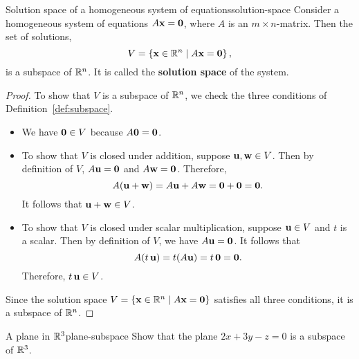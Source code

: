 \begin{proposition}{Solution space of a homogeneous system of equations}{solution-space}
  Consider a homogeneous system of equations $A\mbox{\bf x} = \mbox{\bf 0}$,
  where $A$ is an $m\times n$-matrix. Then the set of solutions,
  \begin{equation*}
    V=\left\{\mbox{\bf x}\in\mathbb{R}^n \mid A\mbox{\bf x} = \mbox{\bf 0}\right\},
  \end{equation*}
  is a subspace of\/ $\mathbb{R}^n$. It is called the \textbf{solution space} of
  the system.%
\end{proposition}

\begin{proof}
  To show that $V$ is a subspace of\/ $\mathbb{R}^{n}$, we check the three
  conditions of Definition~\ref{def:subspace}.
  \begin{itemize}
  \item We have $\mbox{\bf 0}\in V$ because $A\mbox{\bf 0}=\mbox{\bf 0}$.
  \item To show that $V$ is closed under addition, suppose
    $\mbox{\bf u},\mbox{\bf w}\in V$.  Then by definition of $V$,
    $A\mbox{\bf u}=\mbox{\bf 0}$ and $A\mbox{\bf w}=\mbox{\bf 0}$.  Therefore,
    \begin{equation*}
      A(\mbox{\bf u}+\mbox{\bf w}) = A\mbox{\bf u} + A\mbox{\bf w} = \mbox{\bf 0}+\mbox{\bf 0}
      = \mbox{\bf 0}.
    \end{equation*}
    It follows that $\mbox{\bf u}+\mbox{\bf w}\in V$.
  \item To show that $V$ is closed under scalar multiplication,
    suppose $\mbox{\bf u}\in V$ and $t$ is a scalar. Then by definition of
    $V$, we have $A\mbox{\bf u}=\mbox{\bf 0}$. It follows that
    \begin{equation*}
      A(t\,\mbox{\bf u}) = t(A\mbox{\bf u}) = t\,\mbox{\bf 0} = \mbox{\bf 0}.
    \end{equation*}
    Therefore, $t\,\mbox{\bf u}\in V$.
  \end{itemize}
  Since the solution space
  $V=\left\{\mbox{\bf x}\in\mathbb{R}^n \mid A\mbox{\bf x} = \mbox{\bf 0}\right\}$ satisfies all
  three conditions, it is a subspace of\/ $\mathbb{R}^n$.
\end{proof}

\begin{example}{A plane in $\mathbb{R}^3$}{plane-subspace}
  Show that the plane $2x+3y-z=0$ is a subspace of\/ $\mathbb{R}^3$.
\end{example}


